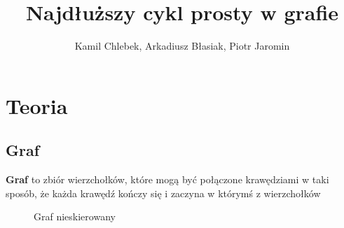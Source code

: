 \documentclass[a4paper,12pt]{article}
\title{Najdłuższy cykl prosty w grafie}
\author{Kamil Chlebek, Arkadiusz Błasiak, Piotr Jaromin}
\begin{document}
\maketitle
\newpage
\tableofcontents
\newpage
\section{Teoria}
\subsection{Graf}

\textbf{Graf} to zbiór wierzchołków, które mogą być połączone krawędziami w taki sposób, że każda krawędź kończy się i zaczyna w którymś z wierzchołków

\begin{figure}[htbp]
\caption{Graf nieskierowany}
\end{figure}
\end{document}
